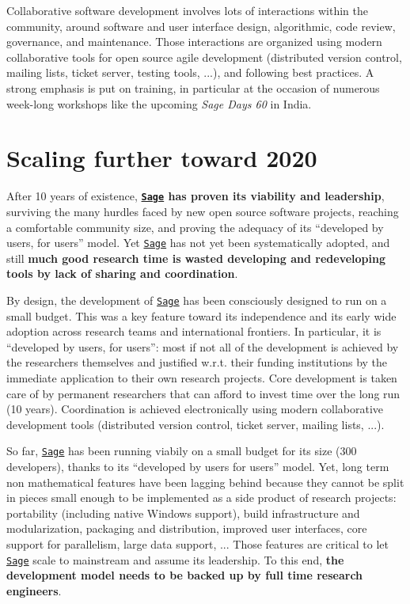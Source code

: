 \documentclass[a4,12pt]{amsart}
\newcommand{\sage}{\href{http://www.sagemath.org/}{\texttt{Sage}}\xspace}
\begin{document}
Collaborative software development involves lots of interactions
within the community, around software and user interface design,
algorithmic, code review, governance, and maintenance. Those
interactions are organized using modern collaborative tools for open
source agile development (distributed version control, mailing lists,
ticket server, testing tools, ...), and following best practices. A
strong emphasis is put on training, in particular at the occasion of
numerous week-long workshops like the upcoming \emph{Sage Days 60} in
India.

\section{Scaling further toward 2020}

After 10 years of existence, \textbf{\sage{} has proven its viability
  and leadership}, surviving the many hurdles faced by new open source
software projects, reaching a comfortable community size, and proving
the adequacy of its ``developed by users, for users'' model.  Yet
\sage{} has not yet been systematically adopted, and still \textbf{much
  good research time is wasted developing and redeveloping tools by
  lack of sharing and coordination}.

By design, the development of \sage{} has been consciously designed to
run on a small budget. This was a key feature toward its independence
and its early wide adoption across research teams and international
frontiers. In particular, it is ``developed by users, for users'':
most if not all of the development is achieved by the researchers
themselves and justified w.r.t. their funding institutions by the
immediate application to their own research projects. Core development
is taken care of by permanent researchers that can afford to invest
time over the long run (10 years). Coordination is achieved
electronically using modern collaborative development tools
(distributed version control, ticket server, mailing lists, ...).

So far, \sage{} has been running viabily on a small budget for its size
(300 developers), thanks to its ``developed by users for users''
model. Yet, long term non mathematical features have been lagging
behind because they cannot be split in pieces small enough to be
implemented as a side product of research projects: portability
(including native Windows support), build infrastructure and
modularization, packaging and distribution, improved user interfaces,
core support for parallelism, large data support, ... Those features
are critical to let \sage{} scale to mainstream and assume its
leadership. To this end, \textbf{the development model needs to be
  backed up by full time research engineers}.
\end{document}
